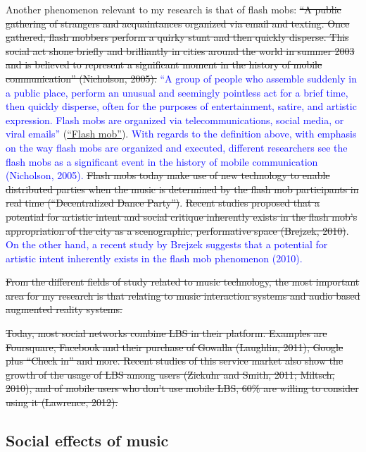 \documentclass[a4paper,11pt]{article}
\newcommand{\new}[1]{\textcolor{blue}{#1}}
\begin{document}
Another phenomenon relevant to my research is that of flash mobs: \st{``A public gathering of strangers and acquaintances organized via email and texting. Once gathered, flash mobbers perform a quirky stunt and then quickly disperse. This social act shone briefly and brilliantly in cities around the world in summer 2003 and is believed to represent a significant moment in the history of mobile communication'' (Nicholson, 2005).} \new{``A group of people who assemble suddenly in a public place, perform an unusual and seemingly pointless act for a brief time, then quickly disperse, often for the purposes of entertainment, satire, and artistic expression. Flash mobs are organized via telecommunications, social media, or viral emails''} (\href{http://en.wikipedia.org/wiki/Flash_mob}{``Flash mob''}). \new{With regards to the definition above, with emphasis on the way flash mobs are organized and executed, different researchers see the flash mobs as a significant event in the history of mobile communication (Nicholson, 2005).} \st{Flash mobs today make use of new technology to enable distributed parties when the music is determined by the flash mob participants in real time (``Decentralized Dance Party'')}. \st{Recent studies proposed that a potential for artistic intent and social critique inherently exists in the flash mob's appropriation of the city as a scenographic, performative space (Brejzek, 2010)}. \new{On the other hand, a recent study by Brejzek suggests that a potential for artistic intent inherently exists in the flash mob phenomenon (2010).}

\st{From the different fields of study related to music technology, the most important area for my research is that relating to music interaction systems and audio based augmented reality systems.}

\st{Today, most social networks combine LBS in their platform. Examples are Foursquare, Facebook and their purchase of Gowalla (Laughlin, 2011), Google plus ``Check in'' and more. Recent studies of this service market also show the growth of the usage of LBS among users (Zickuhr and Smith, 2011; Miltsch, 2010), and of mobile users who don't use mobile LBS, 60\% are willing to consider using it (Lawrence, 2012).}

\subsection{Social effects of music}
\end{document}

